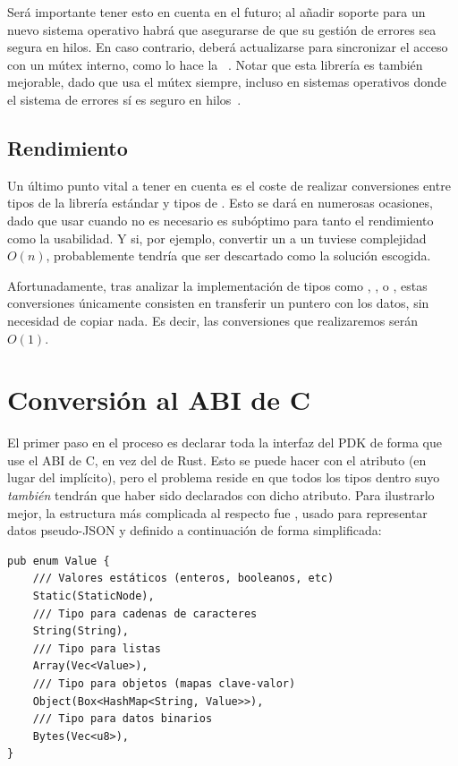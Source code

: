 Será importante tener esto en cuenta en el futuro; al añadir soporte para un
nuevo sistema operativo habrá que asegurarse de que su gestión de errores sea
segura en hilos. En caso contrario, deberá actualizarse  para
sincronizar el acceso con un mútex interno, como lo hace la \crate
{}~\cite{thsafe_dlopen}. Notar que esta librería es también
mejorable, dado que usa el mútex siempre, incluso en sistemas operativos donde
el sistema de errores sí es seguro en hilos~\cite{thsafe_dlopen_issue}.

\subsection{Rendimiento}\label{abiperf}

Un último punto vital a tener en cuenta es el coste de realizar conversiones
entre tipos de la librería estándar y tipos de \abistable. Esto se dará en
numerosas ocasiones, dado que usar \abistable cuando no es necesario es
subóptimo para tanto el rendimiento como la usabilidad. Y si, por ejemplo,
convertir un  a un  tuviese complejidad $O(n)$,
probablemente \abistable tendría que ser descartado como la solución escogida.

Afortunadamente, tras analizar la implementación de tipos como ,
,  o , estas conversiones únicamente
consisten en transferir un puntero con los datos, sin necesidad de copiar nada.
Es decir, las conversiones que realizaremos serán $O(1)$.

\section{Conversión al ABI de C}

El primer paso en el proceso es declarar toda la interfaz del PDK de forma que
use el ABI de C, en vez del de Rust. Esto se puede hacer con el atributo
\rust{#[repr(C)]} (en lugar del  implícito), pero el
problema reside en que todos los tipos dentro suyo \emph{también} tendrán que
haber sido declarados con dicho atributo. Para ilustrarlo mejor, la estructura
más complicada al respecto fue , usado para representar datos
pseudo-JSON y definido a continuación de forma simplificada:

\begin{verbatim}
pub enum Value {
    /// Valores estáticos (enteros, booleanos, etc)
    Static(StaticNode),
    /// Tipo para cadenas de caracteres
    String(String),
    /// Tipo para listas
    Array(Vec<Value>),
    /// Tipo para objetos (mapas clave-valor)
    Object(Box<HashMap<String, Value>>),
    /// Tipo para datos binarios
    Bytes(Vec<u8>),
}
\end{verbatim}

